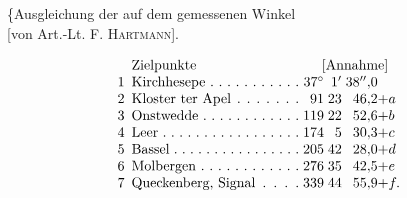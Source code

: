 \vspace*{2.8\baselineskip}
{\centering
[4.]\par\medskip
\{Ausgleichung der auf dem  gemessenen Winkel\\
{[}von Art.-Lt. F. \textsc{Hartmann}].\par}
\[
\begin{array}{@{}r@{\enspace}l@{\;}r@{\;}r@{\;}r@{}l@{}}
 &\text{Zielpunkte}&\multicolumn{4}{c@{}}{\text{[Annahme]}}\\
 1&\text{\hbox to 12em{Kirchhesepe\hfil.\hfil.\hfil.\hfil.\hfil.\hfil.\hfil.\hfil.\hfil.\hfil.\hfil.}}&37^\circ&1'&38''{,}0&\\
 2&\text{\hbox to 12em{Kloster ter Apel\hfil.\hfil.\hfil.\hfil.\hfil.\hfil.\hfil.}}&91&23&46{,}2&+a\\
 3&\text{\hbox to 12em{Onstwedde\hfil.\hfil.\hfil.\hfil.\hfil.\hfil.\hfil.\hfil.\hfil.\hfil.\hfil.\hfil.}}&119&22&52{,}6&+b\\
 4&\text{\hbox to 12em{Leer\hfil.\hfil.\hfil.\hfil.\hfil.\hfil.\hfil.\hfil.\hfil.\hfil.\hfil.\hfil.\hfil.\hfil.\hfil.\hfil.\hfil.}}&174&5&30{,}3&+c\\
 5&\text{\hbox to 12em{Bassel\hfil.\hfil.\hfil.\hfil.\hfil.\hfil.\hfil.\hfil.\hfil.\hfil.\hfil.\hfil.\hfil.\hfil.\hfil.\hfil.}}&205&42&28{,}0&+d\\
 6&\text{\hbox to 12em{Molbergen\hfil.\hfil.\hfil.\hfil.\hfil.\hfil.\hfil.\hfil.\hfil.\hfil.\hfil.\hfil.}}&276&35&42{,}5&+e\\
 7&\text{\hbox to 12em{Queckenberg, Signal\hfil.\hfil.\hfil.\hfil.}}&339&44&55{,}9&+f.
\end{array}
\]
